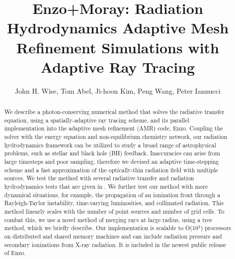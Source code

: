 \documentclass[apj,onecolumn]{emulateapj}
\begin{document}

\title{Enzo+Moray: Radiation Hydrodynamics Adaptive Mesh Refinement
  Simulations with Adaptive Ray Tracing} 

\author{John H. Wise, 
  Tom Abel, 
  Ji-hoon Kim, 
  Peng Wang,
  Peter Iannucci}


\begin{abstract}

  We describe a photon-conserving numerical method that solves the
  radiative transfer equation, using a spatially-adaptive ray tracing
  scheme, and its parallel implementation into the adaptive mesh
  refinement (AMR) code, Enzo.  Coupling the solver with the energy
  equation and non-equilibrium chemistry network, our radiation
  hydrodynamics framework can be utilized to study a broad range of
  astrophysical problems, such as stellar and black hole (BH)
  feedback.  Inaccuracies can arise from large timesteps and poor
  sampling, therefore we devised an adaptive time-stepping scheme and a
  fast approximation of the optically-thin radiation field with
  multiple sources.  We test the method with several radiative
  transfer and radiation hydrodynamics tests that are given in
  \citet{RT06, Iliev09}.  We further test our method with more
  dynamical situations, for example, the propagation of an ionization
  front through a Rayleigh-Taylor instability, time-varying
  luminosities, and collimated radiation.  This method linearly scales
  with the number of point sources and number of grid cells.  To
  combat this, we use a novel method of merging rays at large radius,
  using a tree method, which we briefly describe.  Our implementation
  is scalable to O(10$^3$) processors on distributed and shared memory
  machines and can include radiation pressure and secondary
  ionizations from X-ray radiation.  It is included in the newest
  public release of Enzo.
  
\end{abstract}
\end{document}
